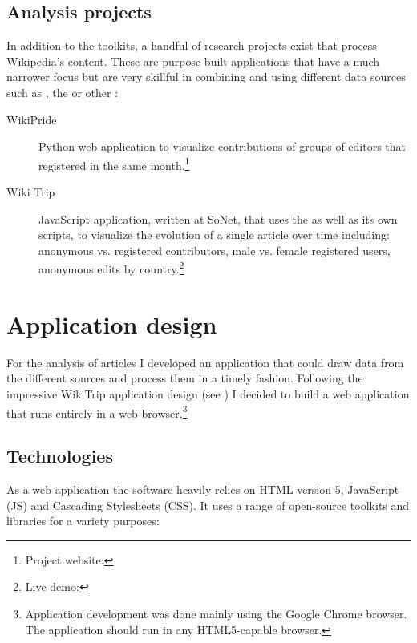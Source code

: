 \subsection{Analysis projects}\label{sub:analysisprojects}

In addition to the toolkits, a handful of research projects exist that process Wikipedia's content.
These are purpose built applications that have a much narrower focus but are very skillful in combining and using different data sources such as , the  or other :

\begin{description}
\item[WikiPride] Python web-application  to visualize contributions of groups of editors that registered in the same month.\footnote{Project website: }
\item[Wiki Trip] JavaScript application, written at SoNet, that uses the  as well as its own  scripts, to visualize the evolution of a single article over time including: anonymous vs. registered contributors, male vs. female registered users, anonymous edits by country.\footnote{Live demo: } 
\end{description}


\section{Application design}

For the analysis of articles I developed an application that could draw data from the different sources and process them in a timely fashion.
Following the impressive WikiTrip application design (see ) I decided to build a web application that runs entirely in a web browser.\footnote{Application development was done mainly using the Google Chrome browser. The application should run in any HTML5-capable browser.}

\subsection{Technologies}

As a web application the software heavily relies on HTML version 5, JavaScript (JS) and Cascading Stylesheets (CSS). 
It uses a range of open-source toolkits and libraries for a variety purposes:

